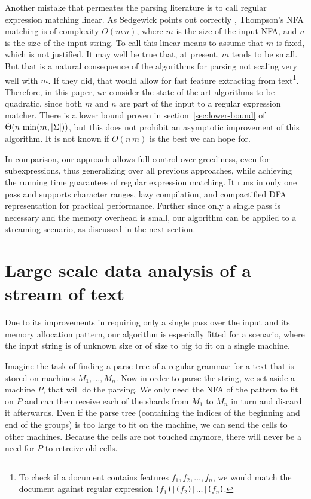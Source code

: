 \documentclass[11pt]{Thesis}
\theoremstyle{definition}
\newcommand{\Secref}[1]{section~\ref{sec:#1}}
\begin{document}
Another mistake that permeates the parsing literature is to call
regular expression matching linear. As Sedgewick points out correctly
\cite{Sedg90a}, Thompson's NFA matching is of complexity $O(m\, n)$,
where $m$ is the size of the input NFA, and $n$ is the size of the
input string. To call this linear means to assume that $m$ is fixed,
which is not justified. It may well be true that, at present, $m$
tends to be small. But that is a natural consequence of the algorithms for
parsing not scaling very well with $m$. If they did, that would allow for
fast feature extracting from text\footnote{To check if a document
contains features $f_1, f_2, \dots, f_n$, we would match the document
against regular expression \texttt{($f_1$)|($f_2$)|$\dots$|($f_n$)}.}.
Therefore, in this paper, we consider the state of the art algorithms
to be quadratic, since both $m$ and $n$ are part of the input to a
regular expression matcher. There is a lower bound proven in 
\Secref{lower-bound} of $\Theta(n\, \min(m, \left|\Sigma\right|))$, but this does 
not prohibit an asymptotic improvement of this algorithm. It is not known if 
$O(n\, m)$ is the best we can hope for.

In comparison, our approach allows full control over greediness, even for
subexpressions, thus generalizing over all previous approaches, while achieving
the running time guarantees of regular expression matching. It runs in only one
pass and supports character ranges, lazy compilation, and compactified DFA
representation for practical performance. Further since only a single pass is 
necessary and the memory overhead is small, our algorithm can be applied to a 
streaming scenario, as discussed in the next section.

\section{Large scale data analysis of a stream of text}
Due to its improvements in requiring only a single pass over the input and 
its memory allocation pattern, our algorithm is especially fitted for a 
scenario, where the input string is of unknown size or of size to big to fit 
on a single machine. 

Imagine the task of finding a parse tree of a regular grammar for a text 
that is stored on machines $M_1, \dots, M_n$. Now in order to parse the 
string, we set aside a machine $P$, that will do the parsing. We only need the NFA of the 
pattern to fit on $P$ and can then receive each of the shards 
from $M_1$ to $M_n$ in turn and discard it afterwards. Even if the parse tree 
(containing the indices of the beginning and end of the groups) is too large 
to fit on the machine, we can send the cells to other machines. Because the 
cells are not touched anymore, there will never be a need for $P$ to retreive 
old cells.
\end{document}
